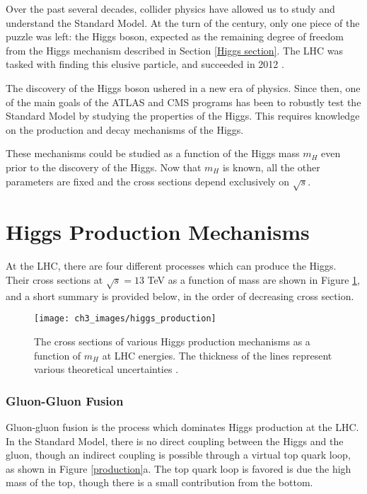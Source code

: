 \documentclass[10pt,a4paper]{book}
\begin{document}
Over the past several decades, collider physics have allowed us to study and understand the Standard Model. At the turn of the century, only one piece of the puzzle was left: the Higgs boson, expected as the remaining degree of freedom from the Higgs mechanism described in Section \ref{Higgs section}. The LHC was tasked with finding this elusive particle, and succeeded in 2012 \cite{ATLAS:2012yve, CMS:2012qbp}.

The discovery of the Higgs boson ushered in a new era of physics. Since then, one of the main goals of the ATLAS and CMS programs has been to robustly test the Standard Model by studying the properties of the Higgs. This requires knowledge on the production and decay mechanisms of the Higgs. 

These mechanisms could be studied as a function of the Higgs mass $m_{H}$ even prior to the discovery of the Higgs. Now that $m_{H}$ is known, all the other parameters are fixed and the cross sections depend exclusively on $\sqrt{s}$. 

\section{Higgs Production Mechanisms}

At the LHC, there are four different processes which can produce the Higgs. Their cross sections at $\sqrt{s} = 13$ TeV as a function of mass are shown in Figure \ref{Higgs production}, and a short summary is provided below, in the order of decreasing cross section.

\begin{figure}
\centering
\texttt{[image: ch3\_images/higgs\_production]}
\caption{The cross sections of various Higgs production mechanisms as a function of $m_H$ at LHC energies. The thickness of the lines represent various theoretical uncertainties \cite{LHCHiggsCrossSectionWorkingGroup:2016ypw}.}
\label{Higgs production}
\end{figure}

\subsubsection{Gluon-Gluon Fusion}
Gluon-gluon fusion is the process which dominates Higgs production at the LHC.
In the Standard Model, there is no direct coupling between the Higgs and the gluon, though an indirect coupling is possible through a virtual top quark loop, as shown in Figure \ref{production}a. The top quark loop is favored is due the high mass of the top, though there is a small contribution from the bottom.
\end{document}
